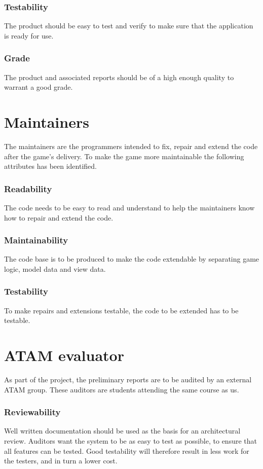         \subsubsection*{Testability}
        The product should be easy to test and verify to make sure that the application is ready for use.

        \subsubsection*{Grade}
        The product and associated reports should be of a high enough quality to warrant a good grade.

    \section{Maintainers}
    The maintainers are the programmers intended to fix, repair and extend the code after the game's delivery. To make the game more maintainable the following attributes has been identified.

        \subsubsection*{Readability}
        The code needs to be easy to read and understand to help the maintainers know how to repair and extend the code.

        \subsubsection*{Maintainability}
        The code base is to be produced to make the code extendable by separating game logic, model data and view data.

        \subsubsection*{Testability}
        To make repairs and extensions testable, the code to be extended has to be testable.

    
    
    \section{ATAM evaluator}
    As part of the project, the preliminary reports are to be audited by an external ATAM group. These auditors are students attending the same course as us.

        \subsubsection*{Reviewability}
        Well written documentation should be used as the basis for an architectural review. Auditors want the system to be as easy to test as possible, to ensure that all features can be tested. Good testability will therefore result in less work for the testers, and in turn a lower cost.


